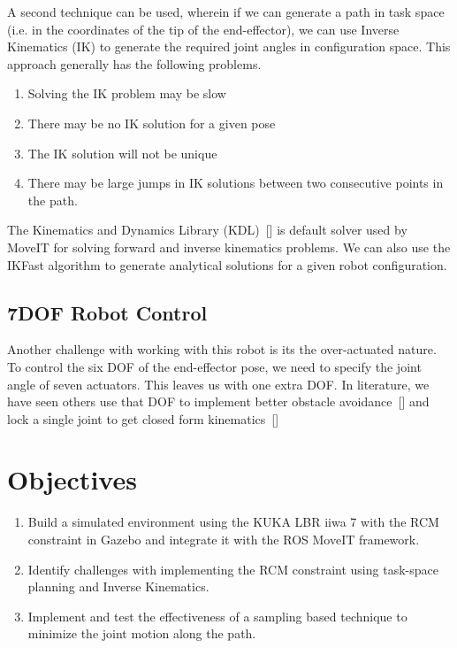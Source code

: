 \documentclass[BTech]{iitmdiss}
\begin{document}

    A second technique can be used, wherein if we can generate a path in task space (i.e. in the coordinates of the tip of the end-effector),
    we can use Inverse Kinematics (IK) to generate the required joint angles in configuration space. This approach generally has the following problems.
    \begin{enumerate}
        \item Solving the IK problem may be slow
        \item There may be no IK solution for a given pose
        \item The IK solution will not be unique
        \item There may be large jumps in IK solutions between two consecutive points in the path.
    \end{enumerate}

    The Kinematics and Dynamics Library (KDL)~[\cite{kdl-url}] is default solver used by MoveIT for solving forward and inverse kinematics problems.
    We can also use the IKFast algorithm to generate analytical solutions for a given robot configuration.

    \subsection{7DOF Robot Control}

    Another challenge with working with this robot is its the over-actuated nature.
    To control the six DOF of the end-effector pose, we need to specify the joint angle of seven actuators.
    This leaves us with one extra DOF.
    In literature, we have seen others use that DOF to implement better obstacle avoidance~[\cite{Doliwa_2020}] and lock a single joint to get closed form kinematics~[\cite{Asthana}]


    \section{Objectives}

    \begin{enumerate}
        \item Build a simulated environment using the KUKA LBR iiwa 7 with the RCM constraint in Gazebo and integrate it with the ROS MoveIT framework.
        \item Identify challenges with implementing the RCM constraint using task-space planning and Inverse Kinematics.
        \item Implement and test the effectiveness of a sampling based technique to minimize the joint motion along the path.
    \end{enumerate}
\end{document}
